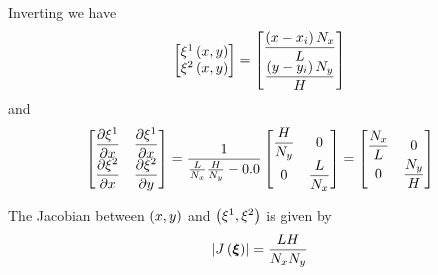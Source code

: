 Inverting we have
\begin{equation}
  \begin{bmatrix}
     \xi^{1}\left( x,y \right)  \\
     \xi^{2}\left( x,y \right) 
  \end{bmatrix} = \begin{bmatrix}
    \dfrac{\left( x-x_{i} \right)N_{x}}{L} \\
    \dfrac{\left( y-y_{i} \right)N_{y}}{H} 
  \end{bmatrix}
\end{equation}
and
\begin{equation}
  \begin{bmatrix}
     \dfrac{\partial \xi^{1}}{\partial x}  &  \dfrac{\partial \xi^{1}}{\partial x}  \\
     \dfrac{\partial \xi^{2}}{\partial x}  &  \dfrac{\partial \xi^{2}}{\partial y}          
  \end{bmatrix} = \dfrac{1}{\frac{L}{N_{x}}\frac{H}{N_{y}}-0.0} \begin{bmatrix}
    \dfrac{H}{N_{y}} & 0 \\
    0 & \dfrac{L}{N_{x}}
  \end{bmatrix} = \begin{bmatrix}
    \dfrac{N_{x}}{L} & 0 \\
    0 & \dfrac{N_{y}}{H}
  \end{bmatrix}
\end{equation}

The Jacobian between $\left( x,y \right)$ and $\left( \xi^{1},\xi^{2} \right)$ is given by
\begin{equation}
  \left|  J\left(  \boldsymbol{\xi}  \right)  \right|=\dfrac{LH}{N_{x}N_{y}}
\end{equation}

